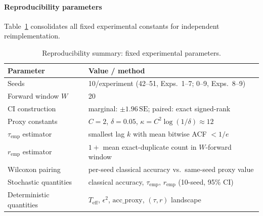 \documentclass[sensors,article,submit,pdftex,moreauthors]{Definitions/mdpi}
\newcommand{\Teff}{T_{\mathrm{eff}}}
\providecommand{\DIFaddbeginFL}{} %
\providecommand{\DIFaddendFL}{} %
\providecommand{\DIFdelbeginFL}{} %
\providecommand{\DIFdelendFL}{} %
\begin{document}
\paragraph{Reproducibility parameters} Table~\ref{tab:repro} consolidates all fixed experimental constants for independent reimplementation.

\begin{table}[t]
\centering
\caption{Reproducibility summary: fixed experimental parameters.}
\label{tab:repro}
\DIFdelbeginFL %
\DIFdelendFL \DIFaddbeginFL \small
\begin{tabular}{@{}ll@{}}
\toprule
Parameter & Value / method \\
\midrule
Seeds & 10/experiment (42--51, Exps.\ 1--7; 0--9, Exps.\ 8--9) \\
Forward window $W$ & 20 \\
CI construction & marginal: $\pm 1.96\,\mathrm{SE}$; paired: exact signed-rank \\
Proxy constants & $C = 2$, $\delta = 0.05$, $\kappa = C^2 \log(1/\delta) \approx 12$ \\
$\tau_{\text{emp}}$ estimator & smallest lag $k$ with mean bitwise ACF $< 1/e$ \\
$r_{\text{emp}}$ estimator & $1 +$ mean exact-duplicate count in $W$-forward window \\
Wilcoxon pairing & per-seed classical accuracy vs.\ same-seed proxy value \\
Stochastic quantities & classical accuracy, $\tau_{\text{emp}}$, $r_{\text{emp}}$ (10-seed, 95\% CI) \\
Deterministic quantities & $\Teff$, $\epsilon^2$, $\mathrm{acc\_proxy}$, $(\tau,r)$ landscape \\
\bottomrule
\end{tabular}
\DIFaddendFL \end{table}
\end{document}
